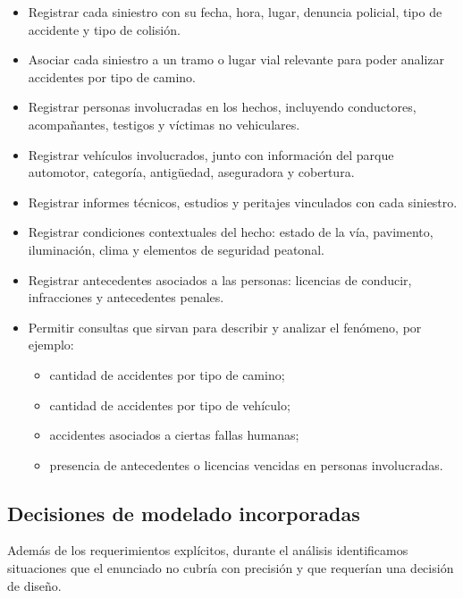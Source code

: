 \documentclass[12pt,a4paper]{article}
\begin{document}
\begin{itemize}[leftmargin=*]
    \item Registrar cada siniestro con su fecha, hora, lugar, denuncia policial, tipo de accidente y tipo de colisión.
    \item Asociar cada siniestro a un tramo o lugar vial relevante para poder analizar accidentes por tipo de camino.
    \item Registrar personas involucradas en los hechos, incluyendo conductores, acompañantes, testigos y víctimas no vehiculares.
    \item Registrar vehículos involucrados, junto con información del parque automotor, categoría, antigüedad, aseguradora y cobertura.
    \item Registrar informes técnicos, estudios y peritajes vinculados con cada siniestro.
    \item Registrar condiciones contextuales del hecho: estado de la vía, pavimento, iluminación, clima y elementos de seguridad peatonal.
    \item Registrar antecedentes asociados a las personas: licencias de conducir, infracciones y antecedentes penales.
    \item Permitir consultas que sirvan para describir y analizar el fenómeno, por ejemplo:
    \begin{itemize}
        \item cantidad de accidentes por tipo de camino;
        \item cantidad de accidentes por tipo de vehículo;
        \item accidentes asociados a ciertas fallas humanas;
        \item presencia de antecedentes o licencias vencidas en personas involucradas.
    \end{itemize}
\end{itemize}

\subsection*{Decisiones de modelado incorporadas}

Además de los requerimientos explícitos, durante el análisis identificamos situaciones que el enunciado no cubría con precisión y que requerían una decisión de diseño.
\end{document}

